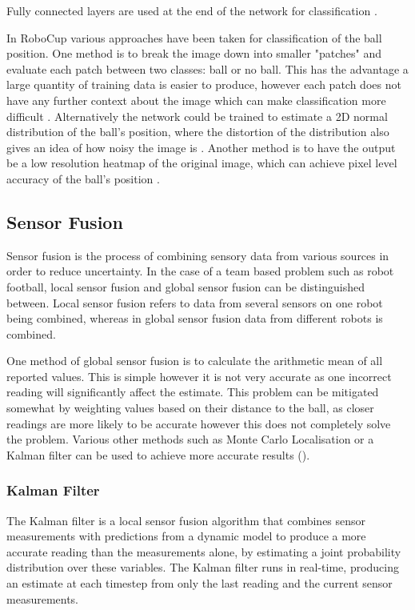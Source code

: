 Fully connected layers are used at the end of the network for classification \cite{cnn}.

In RoboCup various approaches have been taken for classification of the ball position. One method is to break the image down into smaller "patches" and evaluate each patch between two classes: ball or no ball. This has the advantage a large quantity of training data is easier to produce, however each patch does not have any further context about the image which can make classification more difficult \cite{Gabel2018}. Alternatively the network could be trained to estimate a 2D normal distribution of the ball's position, where the distortion of the distribution also gives an idea of how noisy the image is \cite{Speck2016}. Another method is to have the output be a low resolution heatmap of the original image, which can achieve pixel level accuracy of the ball's position \cite{Speck2018}.

\nocite{Kukleva2019}
\nocite{Teimouri2019}

\subsection{Sensor Fusion}

Sensor fusion is the process of combining sensory data from various sources in order to reduce uncertainty. In the case of a team based problem such as robot football, local sensor fusion and global sensor fusion can be distinguished between. Local sensor fusion refers to data from several sensors on one robot being combined, whereas in global sensor fusion data from different robots is combined. 

One method of global sensor fusion is to calculate the arithmetic mean of all reported values. This is simple however it is not very accurate as one incorrect reading will significantly affect the estimate. This problem can be mitigated somewhat by weighting values based on their distance to the ball, as closer readings are more likely to be accurate however this does not completely solve the problem. Various other methods such as Monte Carlo Localisation or a Kalman filter can be used to achieve more accurate results (\cite{Ferrein2005}).

\subsubsection{Kalman Filter}

The Kalman filter is a local sensor fusion algorithm that combines sensor measurements with predictions from a dynamic model to produce a more accurate reading than the measurements alone, by estimating a joint probability distribution over these variables. The Kalman filter runs in real-time, producing an estimate at each timestep from only the last reading and the current sensor measurements.

